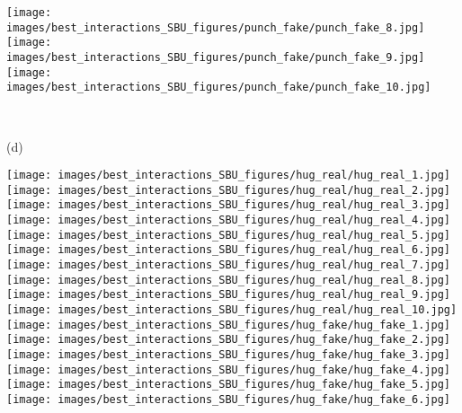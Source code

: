 \documentclass[times,twocolumn,final]{elsarticle}
\begin{document}
\begin{figure*}
\begin{minipage}{0.9\textwidth}
  \hfill
  \texttt{[image: images/best\_interactions\_SBU\_figures/punch\_fake/punch\_fake\_8.jpg]}
  \hfill
  \texttt{[image: images/best\_interactions\_SBU\_figures/punch\_fake/punch\_fake\_9.jpg]}
  \hfill
  \texttt{[image: images/best\_interactions\_SBU\_figures/punch\_fake/punch\_fake\_10.jpg]}
  \hfill
    \end{minipage}\\
    \begin{minipage}{0.08\textwidth}
       (d)\quad{}%
    \end{minipage}
    \begin{minipage}{0.9\textwidth}
  \texttt{[image: images/best\_interactions\_SBU\_figures/hug\_real/hug\_real\_1.jpg]}
  \hfill
  \texttt{[image: images/best\_interactions\_SBU\_figures/hug\_real/hug\_real\_2.jpg]}
  \hfill
  \texttt{[image: images/best\_interactions\_SBU\_figures/hug\_real/hug\_real\_3.jpg]}
  \hfill
  \texttt{[image: images/best\_interactions\_SBU\_figures/hug\_real/hug\_real\_4.jpg]}
  \hfill
  \texttt{[image: images/best\_interactions\_SBU\_figures/hug\_real/hug\_real\_5.jpg]}
  \hfill
  \texttt{[image: images/best\_interactions\_SBU\_figures/hug\_real/hug\_real\_6.jpg]}
  \hfill
  \texttt{[image: images/best\_interactions\_SBU\_figures/hug\_real/hug\_real\_7.jpg]}
  \hfill
  \texttt{[image: images/best\_interactions\_SBU\_figures/hug\_real/hug\_real\_8.jpg]}
  \hfill
  \texttt{[image: images/best\_interactions\_SBU\_figures/hug\_real/hug\_real\_9.jpg]}
  \hfill
  \texttt{[image: images/best\_interactions\_SBU\_figures/hug\_real/hug\_real\_10.jpg]}
  \hfill \\
  \texttt{[image: images/best\_interactions\_SBU\_figures/hug\_fake/hug\_fake\_1.jpg]}
  \hfill
  \texttt{[image: images/best\_interactions\_SBU\_figures/hug\_fake/hug\_fake\_2.jpg]}
  \hfill
  \texttt{[image: images/best\_interactions\_SBU\_figures/hug\_fake/hug\_fake\_3.jpg]}
  \hfill
  \texttt{[image: images/best\_interactions\_SBU\_figures/hug\_fake/hug\_fake\_4.jpg]}
  \hfill
  \texttt{[image: images/best\_interactions\_SBU\_figures/hug\_fake/hug\_fake\_5.jpg]}
  \hfill
  \texttt{[image: images/best\_interactions\_SBU\_figures/hug\_fake/hug\_fake\_6.jpg]}

\end{minipage}
\end{figure*}
\end{document}
